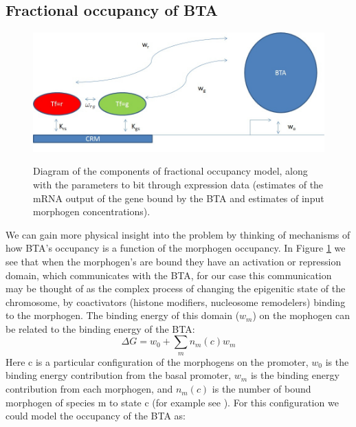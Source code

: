 
\subsection{Fractional occupancy of BTA }
\begin{figure}
  \includegraphics[width=1\textwidth]{PlugandPlay}\\
  \caption{Diagram of the components of fractional occupancy model, along with the parameters to bit through expression data (estimates of the mRNA output of the gene bound by the BTA and estimates of input morphogen concentrations).}\label{PlugandPlay}
\end{figure}

We can gain more physical insight into the problem by thinking of mechanisms of how BTA's occupancy is a function of the morphogen occupancy.  In Figure \ref{PlugandPlay} we see that when the morphogen's are bound they have an activation or repression domain, which communicates with the BTA, for our case this communication may be thought of as the complex process of changing the epigenitic state of the chromosome, by coactivators (histone modifiers, nucleosome remodelers) binding to the morphogen.  The binding energy of this domain ($w_m$) on the mophogen can be related to the binding energy of the BTA:
\begin{equation}\label{hilldg}
     \Delta G = w_{0} + \sum_{m}  n_m(c) w_{m}
\end{equation}
Here c is a particular configuration of the morphogens on the promoter, $w_0$ is the binding energy contribution from the basal promoter, $w_m$ is the binding energy contribution from each morphogen, and $n_m(c)$ is the number of bound morphogen of species m to state c (for example see \cite{pmid19956545}).  For this configuration we could model the occupancy of the BTA as:

